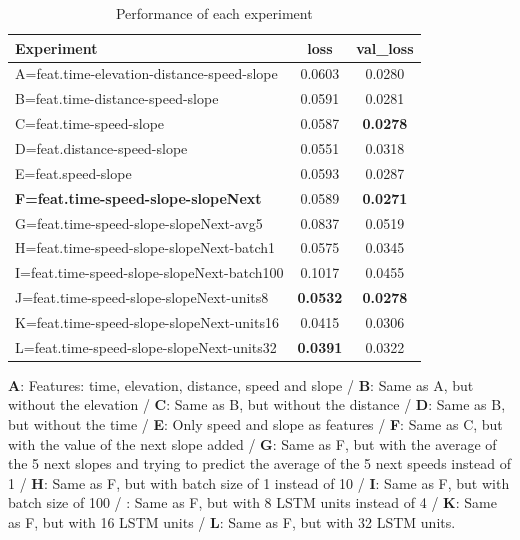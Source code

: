 \documentclass[a4paper, 10pt, conference]{ieeeconf}      %
\begin{document}
\begin{table}[h]
  \caption{Performance of each experiment}
  \begin{center}
    \begin{tabular}{|l||c|c|}
    \hline
    \textbf{Experiment} & \textbf{loss} & \textbf{val\_loss}\\
    \hline
    \hline
    A=feat.time-elevation-distance-speed-slope & 0.0603 & 0.0280\\
    B=feat.time-distance-speed-slope & 0.0591 & 0.0281\\
    C=feat.time-speed-slope & 0.0587 & \textbf{0.0278}\\
    D=feat.distance-speed-slope & 0.0551 & 0.0318\\
    E=feat.speed-slope & 0.0593 & 0.0287\\
    \textbf{F=feat.time-speed-slope-slopeNext} & 0.0589 & \textbf{0.0271}\\
    G=feat.time-speed-slope-slopeNext-avg5 & 0.0837 & 0.0519\\
    H=feat.time-speed-slope-slopeNext-batch1 & 0.0575  & 0.0345\\
    I=feat.time-speed-slope-slopeNext-batch100 & 0.1017 & 0.0455\\
    J=feat.time-speed-slope-slopeNext-units8 & \textbf{0.0532} & \textbf{0.0278}\\
    K=feat.time-speed-slope-slopeNext-units16 & 0.0415 & 0.0306\\
    L=feat.time-speed-slope-slopeNext-units32 & \textbf{0.0391} & 0.0322\\
    \hline
    \end{tabular}
  \end{center}
  \label{tbl:result-by-technique}
  \medskip
  \small
  \textbf{A}: Features: time, elevation, distance, speed and slope / \textbf{B}: Same as A, but without the elevation / \textbf{C}: Same as B, but without the distance / \textbf{D}: Same as B, but without the time / \textbf{E}: Only speed and slope as features / \textbf{F}: Same as C, but with the value of the next slope added / \textbf{G}: Same as F, but with the average of the 5 next slopes and trying to predict the average of the 5 next speeds instead of 1 / \textbf{H}: Same as F, but with batch size of 1 instead of 10 / \textbf{I}: Same as F, but with batch size of 100 / : Same as F, but with 8 LSTM units instead of 4 / \textbf{K}: Same as F, but with 16 LSTM units / \textbf{L}: Same as F, but with 32 LSTM units.
\end{table}
\end{document}
